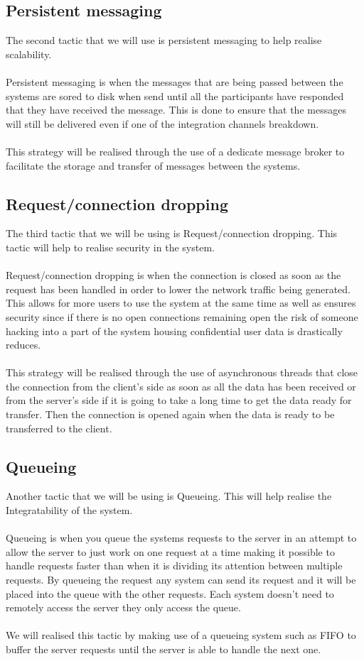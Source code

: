 \documentclass[a4paper]{article}
\begin{document}
\subsection{Persistent messaging}
The second tactic that we will use is persistent messaging to help realise scalability. 
\\
\\Persistent messaging is when the messages that are being passed between the systems are sored to disk when send until all the participants have responded that they have received the message. This is done to ensure that the messages will still be delivered even if one of the integration channels breakdown.
\\
\\This strategy will be realised through the use of a dedicate message broker to facilitate the storage and transfer of messages between the systems. 
\\
\subsection{Request/connection dropping}
The third tactic that we will be using is Request/connection dropping. This tactic will help to realise security in the system.
\\
\\ Request/connection dropping is when the connection is closed as soon as the request has been handled in order to lower the network traffic being generated. This allows for more users to use the system at the same time as well as ensures security since if there is no open connections remaining open the risk of someone hacking into a part of the system housing confidential user data is drastically reduces. 
\\
\\This strategy will be realised through the use of asynchronous threads that close the connection from the client’s side as soon as all the data has been received or from the server’s side if it is going to take a long time to get the data ready for transfer. Then the connection is opened again when the data is ready to be transferred to the client. 
\\
\subsection{Queueing}
Another tactic that we will be using is Queueing. This will help realise the Integratability of the system.
\\
\\Queueing is when you queue the systems requests to the server in an attempt to allow the server to just work on one request at a time making it possible to handle requests faster than when it is dividing its attention between multiple requests. By queueing the request any system can send its request and it will be placed into the queue with the other requests. Each system doesn’t need to remotely access the server they only access the queue. 
\\
\\We will realised this tactic by making use of a queueing system such as FIFO to buffer the server requests until the server is able to handle the next one. 
\\
\end{document}
